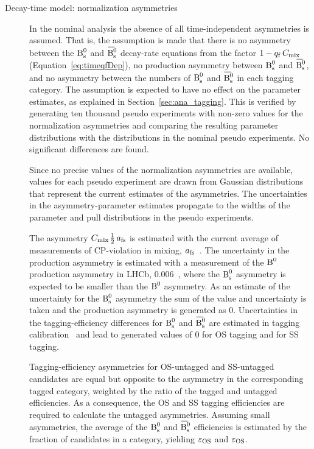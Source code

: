 \begin{description}
\item[Decay-time model: \BsBsbar{} normalization asymmetries]
In the nominal analysis the absence of all time-independent \BsBsbar{} asymmetries is assumed. That is, the assumption is made that there
is no asymmetry between the $\Bs$ and $\Bsbar$ decay-rate equations from the factor $1-\qf\,\Cm$ (Equation~\ref{eq:timeqfDep}), no
production asymmetry between $\Bs$ and $\Bsbar$, and no asymmetry between the numbers of $\Bs$ and $\Bsbar$ in each tagging category. The
assumption is expected to have no effect on the parameter estimates, as explained in Section~\ref{sec:ana_tagging}. This is verified by
generating ten thousand pseudo experiments with non-zero values for the normalization asymmetries and comparing the resulting parameter
distributions with the distributions in the nominal pseudo experiments. No significant differences are found.

Since no precise values of the normalization asymmetries are available, values for each pseudo experiment are drawn from Gaussian
distributions that represent the current estimates of the asymmetries. The uncertainties in the asymmetry-parameter estimates propagate to
the widths of the parameter and pull distributions in the pseudo experiments.

The asymmetry $\Cm$\textapprox$\tfrac{\text{1}}{\text{2}}\,\afs$ is estimated with the current average of measurements of CP-violation in
mixing, $\afs$\texteq{}~\cite{Amhis:2012bh}. The uncertainty in the production asymmetry is estimated with a
measurement of the $\Bd$ production asymmetry in LHCb, 0.006~\cite{LHCb-PAPER-2013-040}, where the $\Bs$ asymmetry is expected
to be smaller than the $\Bd$ asymmetry. As an estimate of the uncertainty for the $\Bs$ asymmetry the sum of the value and uncertainty is
taken and the production asymmetry is generated as 0. Uncertainties in the tagging-efficiency differences for $\Bs$ and $\Bsbar$
are estimated in tagging calibration~\cite{LHCb-ANA-2014-039} and lead to generated values of 0 for OS tagging and
 for SS tagging.

Tagging-efficiency asymmetries for OS-untagged and SS-untagged candidates are equal but opposite to the asymmetry in the corresponding
tagged category, weighted by the ratio of the tagged and untagged efficiencies. As a consequence, the OS and SS tagging efficiencies are
required to calculate the untagged asymmetries. Assuming small asymmetries, the average of the $\Bs$ and $\Bsbar$ efficiencies is estimated
by the fraction of candidates in a category, yielding $\tagCatCoef[\text{OS}]$ and
$\tagCatCoef[\text{OS}]$.


\end{description}
